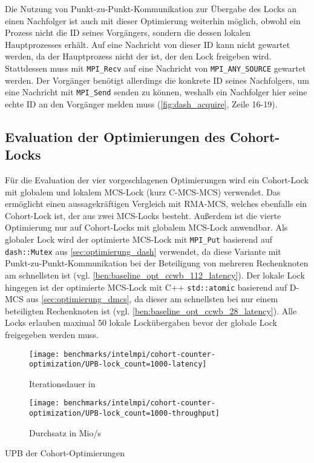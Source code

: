Die Nutzung von Punkt-zu-Punkt-Kommunikation zur Übergabe des Locks an einen Nachfolger ist auch mit dieser Optimierung weiterhin möglich,
obwohl ein Prozess nicht die ID seines Vorgängers,
sondern die dessen lokalen Hauptprozesses erhält.
Auf eine Nachricht von dieser ID kann nicht gewartet werden,
da der Hauptprozess nicht der ist,
der den Lock freigeben wird.
Stattdessen muss mit \texttt{MPI\_Recv} auf eine Nachricht von \texttt{MPI\_ANY\_SOURCE} gewartet werden.
Der Vorgänger benötigt allerdings die konkrete ID seines Nachfolgers,
um eine Nachricht mit \texttt{MPI\_Send} senden zu können,
weshalb ein Nachfolger hier seine echte ID an den Vorgänger melden muss
(\autoref{fig:dash_acquire}, Zeile 16-19).

\clearpage

\subsection{Evaluation der Optimierungen des Cohort-Locks}

Für die Evaluation der vier vorgeschlagenen Optimierungen wird ein Cohort-Lock mit globalem und lokalem MCS-Lock (kurz C-MCS-MCS) verwendet.
Das ermöglicht einen aussagekräftigen Vergleich mit RMA-MCS,
welches ebenfalls ein Cohort-Lock ist,
der aus zwei MCS-Locks besteht.
Außerdem ist die vierte Optimierung nur auf Cohort-Locks mit globalem MCS-Lock anwendbar.
Als globaler Lock wird der optimierte MCS-Lock mit \texttt{MPI\_Put} basierend auf \texttt{dash::Mutex} aus \autoref{sec:optimierung_dash} verwendet,
da diese Variante mit Punkt-zu-Punkt-Kommunikation bei der Beteiligung von mehreren Rechenknoten am schnellsten ist (vgl. \autoref{ben:baseline_opt_ccwb_112_latency}).
Der lokale Lock hingegen ist der optimierte MCS-Lock mit C++ \texttt{std::atomic} basierend auf D-MCS aus \autoref{sec:optimierung_dmcs},
da dieser am schnellsten bei nur einem beteiligten Rechenknoten ist (vgl. \autoref{ben:baseline_opt_ccwb_28_latency}).
Alle Locks erlauben maximal 50 lokale Lockübergaben bevor der globale Lock freigegeben werden muss.

\begin{benchmark}[h]
    \begin{subfigure}{.5\textwidth}
        \texttt{[image: benchmarks/intelmpi/cohort-counter-optimization/UPB-lock\_count=1000-latency]}
        \caption{Iterationsdauer in }
        \label{ben:cohort_counter_upb_latency}
    \end{subfigure}
    \begin{subfigure}{.5\textwidth}
        \texttt{[image: benchmarks/intelmpi/cohort-counter-optimization/UPB-lock\_count=1000-throughput]}
        \caption{Durchsatz in Mio/s}
        \label{ben:cohort_counter_upb_throughput}
    \end{subfigure}
    \caption{UPB der Cohort-Optimierungen}
    \label{ben:cohort_counter_upb}
\end{benchmark}

